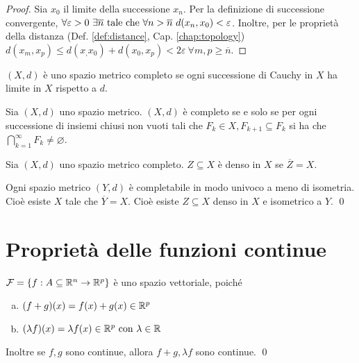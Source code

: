 \begin{proof}
    Sia $x_0$ il limite della successione $x_n$. Per la definizione di successione convergente, $\forall \varepsilon > 0 \ \exists \overline{n} \text{ tale che } \forall n>\overline{n}\ d(x_n,x_0) < \varepsilon$. Inoltre, per le proprietà della distanza (Def. \ref{def:distance}, Cap. \ref{chap:topology}) $d(x_m,x_p)\leq d(x_,x_0)+d(x_0,x_p) < 2\varepsilon \ \forall m,p \geq \overline{n}$.
\end{proof}

\begin{definition}
    $(X, d)$ è uno spazio metrico completo se ogni successione di Cauchy in $X$ ha limite in $X$ rispetto a $d$.
\end{definition}

\begin{theorem}
    Sia $(X,d)$ uno spazio metrico. $(X,d)$ è completo se e solo se per ogni successione di insiemi chiusi non vuoti tali che $F_k \in X, F_{k+1}\subseteq F_k$ si ha che $\bigcap\limits_{k=1}^{\infty}F_k\neq\varnothing$.
\end{theorem}

\begin{definition}
    Sia $(X,d)$ uno spazio metrico completo. $Z \subseteq X$ è denso in $X$ se $\overline{Z} = X$.
\end{definition}

\begin{theorem}
    Ogni spazio metrico $(Y,d)$ è completabile in modo univoco a meno di isometria. Cioè esiste $X$ tale che $\overline{Y} = X$. Cioè esiste $Z \subseteq X$ denso in $X$ e isometrico a $Y$.
    \qed
\end{theorem}

\section{Proprietà delle funzioni continue}

\begin{theorem}
    $\mathcal{F}=\{f: A \subseteq \mathbb{R}^n \to \mathbb{R}^p\}$ è uno spazio vettoriale, poiché
    \begin{enumerate}[a.]
        \item $(f+g)(x)=f(x)+g(x) \in \mathbb{R}^p$
        \item $(\lambda f)(x)= \lambda f(x) \in \mathbb{R}^p \text{ con } \lambda \in \mathbb{R}$
    \end{enumerate}
    Inoltre se $f,g$ sono continue, allora $f+g, \lambda f$ sono continue.
    \qed
\end{theorem}

